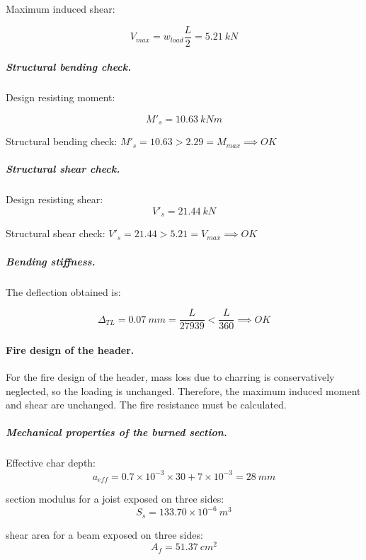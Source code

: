 \noindent Maximum induced shear:

\begin{equation}
  V_{max}= w_{load} \frac{L}{2}= 5.21\ kN
\end{equation}

\subparagraph{Structural bending check.}

\noindent Design resisting moment:

\begin{equation}
  M'_s= 10.63\ kN m
\end{equation}

\noindent Structural bending check: $M'_s = 10.63 > 2.29 = M_{max} \implies OK$

\subparagraph{Structural shear check.}

\noindent Design resisting shear:
\begin{equation}
  V'_s= 21.44\ kN
\end{equation}

\noindent Structural shear check: $V'_s = 21.44 > 5.21 = V_{max} \implies OK$

\subparagraph{Bending stiffness.}
The deflection obtained is:

\begin{equation}
  \Delta_{TL}= 0.07\ mm= \frac{L}{27939} < \frac{L}{360} \implies OK
\end{equation}

\paragraph{Fire design of the header.}
For the fire design of the header, mass loss due to charring is conservatively neglected, so the loading is unchanged. Therefore, the maximum induced moment and shear are unchanged. The fire resistance must be calculated.

\subparagraph{Mechanical properties of the burned section.}

\noindent Effective char depth:
\begin{equation}
  a_{eff}= 0.7 \times 10^{-3} \times 30 + 7 \times 10^{-3}= 28\ mm
\end{equation}

\noindent section modulus for a joist exposed on three sides:
\begin{equation}
  S_s= 133.70 \times 10^{-6}\ m^3
\end{equation}

\noindent shear area for a beam exposed on three sides:
\begin{equation}
  A_f= 51.37\ cm^2
\end{equation}

